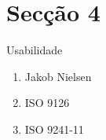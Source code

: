 \documentclass{beamer}
\begin{document}
	\section{Secção 4}
	\begin{frame} {Usabilidade}
		\begin{enumerate}
			\item Jakob Nielsen
			\item ISO 9126
			\item ISO 9241-11
		\end{enumerate}
	\end{frame}
\end{document}
